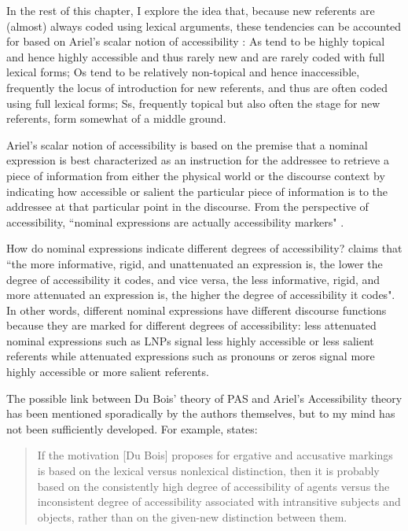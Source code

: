 In the rest of this chapter, I explore the idea that, because new referents are (almost) always coded using lexical arguments, these tendencies can be accounted for based on Ariel's scalar notion of accessibility \citep{ariel1990,ariel2001}: As tend to be highly topical and hence highly accessible and thus rarely new and are rarely coded with full lexical forms; Os tend to be relatively non-topical and hence inaccessible, frequently the locus of introduction for new referents, and thus are often coded using full lexical forms; Ss, frequently topical but also often the stage for new referents, form somewhat of a middle ground.

Ariel's scalar notion of accessibility is based on the premise that a nominal expression is best characterized as an instruction for the addressee to retrieve a piece of information from either the physical world or the discourse context by indicating how accessible or salient the particular piece of information is to the addressee at that particular point in the discourse. From the perspective of accessibility, ``nominal expressions are actually accessibility markers" \citep[31]{ariel2001}. 

How do nominal expressions indicate different degrees of accessibility? \citet[32]{ariel2001} claims that ``the more informative, rigid, and unattenuated an expression is, the lower the degree of accessibility it codes, and vice versa, the less informative, rigid, and more attenuated an expression is, the higher the degree of accessibility it codes". In other words, different nominal expressions have different discourse functions because they are marked for different degrees of accessibility: less attenuated nominal expressions such as LNPs signal less highly accessible or less salient referents while attenuated expressions such as pronouns or zeros signal more highly accessible or more salient referents. 

The possible link between Du Bois' theory of PAS and Ariel's Accessibility theory has been mentioned sporadically by the authors themselves, but to my mind has not been sufficiently developed. For example, \citet[67]{ariel2001} states:

\begin{quote} If the motivation [Du Bois] proposes for ergative and accusative markings is based on the lexical versus nonlexical distinction, then it is probably based on the consistently high degree of accessibility of agents versus the inconsistent degree of accessibility associated with intransitive subjects and objects, rather than on the given-new distinction between them.
\end{quote}

